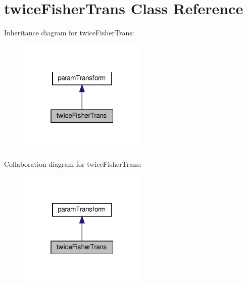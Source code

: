 \hypertarget{classtwiceFisherTrans}{}\section{twice\+Fisher\+Trans Class Reference}
\label{classtwiceFisherTrans}


Inheritance diagram for twice\+Fisher\+Trans\+:
\nopagebreak
\begin{figure}[H]
\begin{center}
\leavevmode
\includegraphics[width=172pt]{classtwiceFisherTrans__inherit__graph}
\end{center}
\end{figure}


Collaboration diagram for twice\+Fisher\+Trans\+:
\nopagebreak
\begin{figure}[H]
\begin{center}
\leavevmode
\includegraphics[width=172pt]{classtwiceFisherTrans__coll__graph}
\end{center}
\end{figure}
